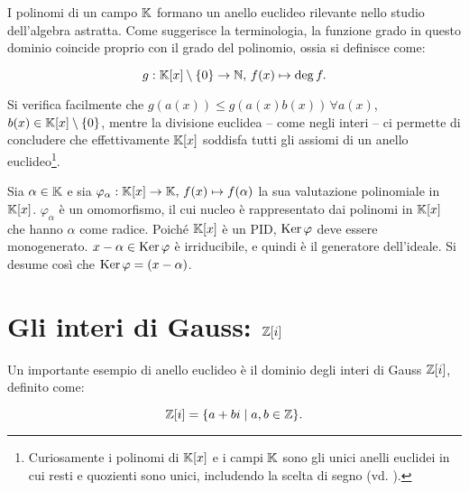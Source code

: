 I polinomi di un campo $\mathbb{K}$ formano un anello euclideo rilevante
nello studio dell'algebra astratta. Come suggerisce la
terminologia, la funzione grado in questo dominio coincide
proprio con il grado del polinomio, ossia si definisce come:

\[g : \mathbb{K}[x] \setminus \{0\} \to \mathbb N, \, f(x) \mapsto \deg f.\]

\vskip 0.1in

Si verifica facilmente che $g(a(x)) \leq g(a(x)b(x)) \, \forall a(x)$, $b(x) \in \mathbb{K}[x] \setminus \{0\}$, mentre la divisione euclidea -- come negli interi -- ci permette
di concludere che effettivamente $\mathbb{K}[x]$ soddisfa tutti gli assiomi di un anello
euclideo\footnote{Curiosamente i polinomi di $\mathbb{K}[x]$ e i campi $\mathbb{K}$ sono gli unici anelli euclidei in cui resti
    e quozienti sono unici, includendo la scelta di segno (vd.
    \cite{10.2307/2315810}).}.

\begin{example}
    Sia $\alpha \in \mathbb{K}$ e sia $\varphi_\alpha : \mathbb{K}[x] \to \mathbb{K}, \, f(x) \mapsto f(\alpha)$
    la sua valutazione polinomiale in $\mathbb{K}[x]$. $\varphi_\alpha$ è un omomorfismo, il cui
    nucleo è rappresentato dai polinomi in $\mathbb{K}[x]$ che hanno $\alpha$ come radice. Poiché
    $\mathbb{K}[x]$ è un PID, $\operatorname{Ker} \varphi$ deve essere monogenerato. $x-\alpha \in \operatorname{Ker} \varphi$
    è irriducibile, e quindi è il generatore dell'ideale. Si desume così che
    $\operatorname{Ker} \varphi = (x-\alpha)$.
\end{example}

\section{Gli interi di Gauss: \texorpdfstring{$\mathbb Z[i]$}{Z[i]}}

Un importante esempio di anello euclideo è il dominio degli interi di Gauss $\mathbb Z[i]$, definito come:

\[\mathbb Z[i] = \{a+bi \mid a, b \in \mathbb Z\}.\]

\vskip 0.1in

